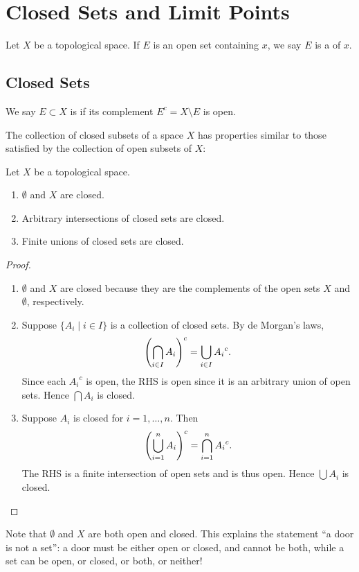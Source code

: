 \section{Closed Sets and Limit Points}
Let $X$ be a topological space.
If $E$ is an open set containing $x$, we say $E$ is a  of $x$.

\subsection{Closed Sets}
\begin{definition}
We say $E\subset X$ is  if its complement $E^c=X\setminus E$ is open.
\end{definition}

The collection of closed subsets of a space $X$ has properties similar to those satisfied by the collection of open subsets of $X$:
\begin{lemma}
Let $X$ be a topological space.
\begin{enumerate}[label=(\roman*)]
\item $\emptyset$ and $X$ are closed.
\item Arbitrary intersections of closed sets are closed.
\item Finite unions of closed sets are closed.
\end{enumerate}
\end{lemma}

\begin{proof} \
\begin{enumerate}[label=(\roman*)]
\item $\emptyset$ and $X$ are closed because they are the complements of the open sets $X$ and $\emptyset$, respectively.
\item Suppose $\{A_i\mid i\in I\}$ is a collection of closed sets. By de Morgan's laws,
\[\left(\bigcap_{i\in I}A_i\right)^c=\bigcup_{i\in I}{A_i}^c.\]
Since each ${A_i}^c$ is open, the RHS is open since it is an arbitrary union of open sets. Hence $\bigcap A_i$ is closed.
\item Suppose $A_i$ is closed for $i=1,\dots,n$. Then
\[\left(\bigcup_{i=1}^{n}A_i\right)^c=\bigcap_{i=1}^{n}{A_i}^c.\]
The RHS is a finite intersection of open sets and is thus open. Hence $\bigcup A_i$ is closed.
\end{enumerate}
\end{proof}

\begin{remark}
Note that $\emptyset$ and $X$ are both open and closed. This explains the statement ``a door is not a set'': a door must be either open or closed, and cannot be both, while a set can be open, or closed, or both, or neither!
\end{remark}


